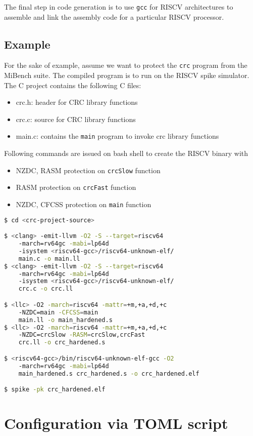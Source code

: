 The final step in code generation is to use \texttt{gcc} for RISCV architectures to assemble and link the
assembly code for a particular RISCV processor.

\subsection{Example}
For the sake of example, assume we want to protect the \texttt{crc} program from the MiBench suite. The
compiled program is to run on the RISCV spike simulator. The C project contains the following C files:

\begin{itemize}
 \item{crc.h: header for CRC library functions}
 \item{crc.c: source for CRC library functions}
 \item{main.c: contains the \texttt{main} program to invoke crc library functions}
\end{itemize}

Following commands are issued on bash shell to create the RISCV binary with
\begin{itemize}
 \item NZDC, RASM protection on \texttt{crcSlow} function
 \item RASM protection on \texttt{crcFast} function
 \item NZDC, CFCSS protection on \texttt{main} function
\end{itemize}

\newpage
\begin{framed}
 \begin{lstlisting}[language=bash, basicstyle=\small\ttfamily]
$ cd <crc-project-source>

$ <clang> -emit-llvm -O2 -S --target=riscv64
    -march=rv64gc -mabi=lp64d
    -isystem <riscv64-gcc>/riscv64-unknown-elf/
    main.c -o main.ll
$ <clang> -emit-llvm -O2 -S --target=riscv64
    -march=rv64gc -mabi=lp64d
    -isystem <riscv64-gcc>/riscv64-unknown-elf/
    crc.c -o crc.ll

$ <llc> -O2 -march=riscv64 -mattr=+m,+a,+d,+c
    -NZDC=main -CFCSS=main
    main.ll -o main_hardened.s
$ <llc> -O2 -march=riscv64 -mattr=+m,+a,+d,+c
    -NZDC=crcSlow -RASM=crcSlow,crcFast
    crc.ll -o crc_hardened.s

$ <riscv64-gcc>/bin/riscv64-unknown-elf-gcc -O2
    -march=rv64gc -mabi=lp64d
    main_hardened.s crc_hardened.s -o crc_hardened.elf

$ spike -pk crc_hardened.elf

\end{lstlisting}
\end{framed}

\section{Configuration via TOML script}
